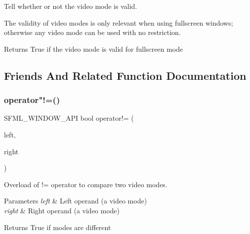 Tell whether or not the video mode is valid. 

The validity of video modes is only relevant when using fullscreen windows; otherwise any video mode can be used with no restriction.

\begin{DoxyReturn}{Returns}
True if the video mode is valid for fullscreen mode 
\end{DoxyReturn}


\subsection{Friends And Related Function Documentation}
\mbox{\label{classsf_1_1_video_mode_abd7bf172d318085ea572b8c10033f7b7}} 
\subsubsection{\texorpdfstring{operator"!=()}{operator!=()}}
{\footnotesize\ttfamily S\+F\+M\+L\+\_\+\+W\+I\+N\+D\+O\+W\+\_\+\+A\+PI bool operator!= (\begin{DoxyParamCaption}\item[{const \hyperlink{classsf_1_1_video_mode}{Video\+Mode} \&}]{left,  }\item[{const \hyperlink{classsf_1_1_video_mode}{Video\+Mode} \&}]{right }\end{DoxyParamCaption})\hspace{0.3cm}{\ttfamily [related]}}



Overload of != operator to compare two video modes. 


\begin{DoxyParams}{Parameters}
{\em left} & Left operand (a video mode) \\
\hline
{\em right} & Right operand (a video mode)\\
\hline
\end{DoxyParams}
\begin{DoxyReturn}{Returns}
True if modes are different 
\end{DoxyReturn}
\mbox{\label{classsf_1_1_video_mode_a8e3d8fa57fa10dca05edbc34c4e2f1a8}} 

